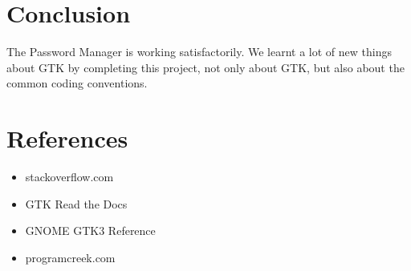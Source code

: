 \documentclass[draft,10pt,a4paper,titlepage]{report}
\begin{document}
\chapter{Conclusion}
\newline\par The Password Manager is working satisfactorily. We learnt a lot of new things about GTK by completing this project, not only about GTK, but also about the common coding conventions. 

\chapter{References}
\begin{itemize}
		\item stackoverflow.com
		\item GTK Read the Docs
		\item GNOME GTK3 Reference
		\item programcreek.com
\end{itemize}
\end{document}

